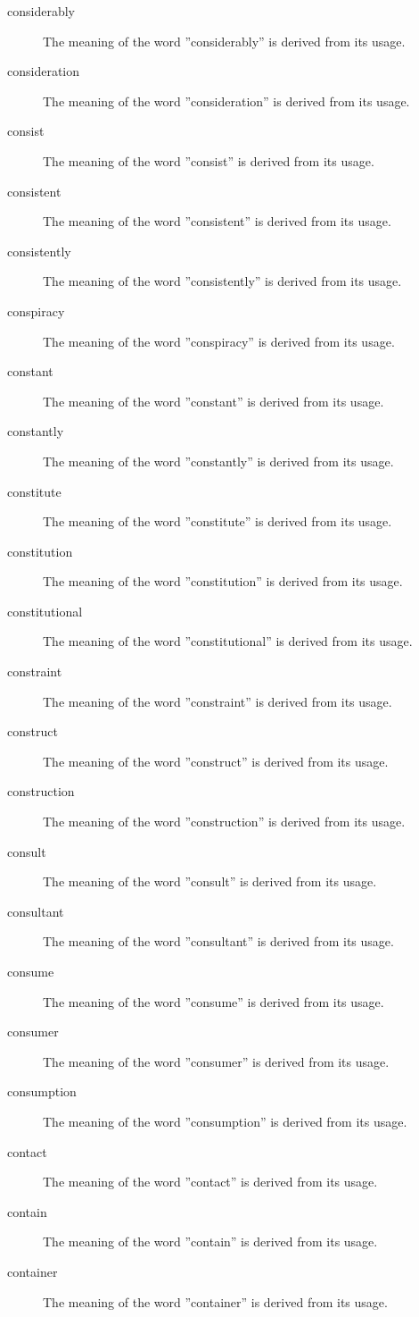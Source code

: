 \documentclass[12pt, letterpaper]{memoir}
\begin{document}
\begin{description}
\item[considerably] The meaning of the word ''considerably'' is derived from its usage.
\item[consideration] The meaning of the word ''consideration'' is derived from its usage.
\item[consist] The meaning of the word ''consist'' is derived from its usage.
\item[consistent] The meaning of the word ''consistent'' is derived from its usage.
\item[consistently] The meaning of the word ''consistently'' is derived from its usage.
\item[conspiracy] The meaning of the word ''conspiracy'' is derived from its usage.
\item[constant] The meaning of the word ''constant'' is derived from its usage.
\item[constantly] The meaning of the word ''constantly'' is derived from its usage.
\item[constitute] The meaning of the word ''constitute'' is derived from its usage.
\item[constitution] The meaning of the word ''constitution'' is derived from its usage.
\item[constitutional] The meaning of the word ''constitutional'' is derived from its usage.
\item[constraint] The meaning of the word ''constraint'' is derived from its usage.
\item[construct] The meaning of the word ''construct'' is derived from its usage.
\item[construction] The meaning of the word ''construction'' is derived from its usage.
\item[consult] The meaning of the word ''consult'' is derived from its usage.
\item[consultant] The meaning of the word ''consultant'' is derived from its usage.
\item[consume] The meaning of the word ''consume'' is derived from its usage.
\item[consumer] The meaning of the word ''consumer'' is derived from its usage.
\item[consumption] The meaning of the word ''consumption'' is derived from its usage.
\item[contact] The meaning of the word ''contact'' is derived from its usage.
\item[contain] The meaning of the word ''contain'' is derived from its usage.
\item[container] The meaning of the word ''container'' is derived from its usage.

\end{description}
\end{document}
